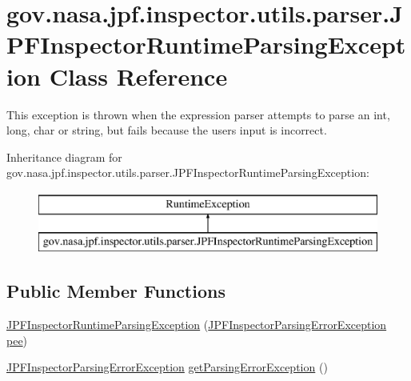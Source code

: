 \hypertarget{classgov_1_1nasa_1_1jpf_1_1inspector_1_1utils_1_1parser_1_1_j_p_f_inspector_runtime_parsing_exception}{}\section{gov.\+nasa.\+jpf.\+inspector.\+utils.\+parser.\+J\+P\+F\+Inspector\+Runtime\+Parsing\+Exception Class Reference}
\label{classgov_1_1nasa_1_1jpf_1_1inspector_1_1utils_1_1parser_1_1_j_p_f_inspector_runtime_parsing_exception}


This exception is thrown when the expression parser attempts to parse an int, long, char or string, but fails because the user\textquotesingle{}s input is incorrect.  


Inheritance diagram for gov.\+nasa.\+jpf.\+inspector.\+utils.\+parser.\+J\+P\+F\+Inspector\+Runtime\+Parsing\+Exception\+:\begin{figure}[H]
\begin{center}
\leavevmode
\includegraphics[height=2.000000cm]{classgov_1_1nasa_1_1jpf_1_1inspector_1_1utils_1_1parser_1_1_j_p_f_inspector_runtime_parsing_exception}
\end{center}
\end{figure}
\subsection*{Public Member Functions}
\begin{DoxyCompactItemize}
\item 
\hyperlink{classgov_1_1nasa_1_1jpf_1_1inspector_1_1utils_1_1parser_1_1_j_p_f_inspector_runtime_parsing_exception_a5bb666e7470e345d78f1f5acc3291976}{J\+P\+F\+Inspector\+Runtime\+Parsing\+Exception} (\hyperlink{classgov_1_1nasa_1_1jpf_1_1inspector_1_1exceptions_1_1_j_p_f_inspector_parsing_error_exception}{J\+P\+F\+Inspector\+Parsing\+Error\+Exception} \hyperlink{classgov_1_1nasa_1_1jpf_1_1inspector_1_1utils_1_1parser_1_1_j_p_f_inspector_runtime_parsing_exception_a58fe9654b65bbe9bd7ee4be5d40f2001}{pee})
\item 
\hyperlink{classgov_1_1nasa_1_1jpf_1_1inspector_1_1exceptions_1_1_j_p_f_inspector_parsing_error_exception}{J\+P\+F\+Inspector\+Parsing\+Error\+Exception} \hyperlink{classgov_1_1nasa_1_1jpf_1_1inspector_1_1utils_1_1parser_1_1_j_p_f_inspector_runtime_parsing_exception_a00e01d72426179433ac11734cba29abe}{get\+Parsing\+Error\+Exception} ()
\end{DoxyCompactItemize}
